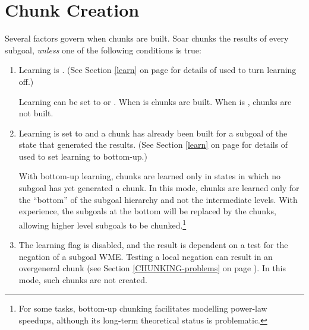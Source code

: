\section{Chunk Creation}
\label{CHUNKING-creation}

Several factors govern when chunks are built. Soar chunks the results of every
subgoal, \emph{unless} one of the following conditions is true:

\begin{enumerate}
\item Learning is . (See Section \ref{learn} on page \pageref{learn}
	for details of  used to turn learning off.) 

	Learning can be set to  or .
	When  is  chunks are built.  
	When  is , chunks are not built. 

\item Learning is set to  and a chunk has already 
	been built for a subgoal of the state that generated the results. 
	(See Section \ref{learn} on page \pageref{learn} for details of 
	 used to set learning to bottom-up.) 

	With bottom-up learning, chunks are learned only in states in which no
	subgoal has yet generated a chunk. In this mode, chunks are learned
	only for the ``bottom'' of the subgoal hierarchy and not the
	intermediate levels. With experience, the subgoals at the bottom will
	be replaced by the chunks, allowing higher level subgoals to be
	chunked.\footnote{For some tasks, bottom-up chunking facilitates
	modelling power-law speedups, although its long-term theoretical
	status is problematic.}
	

\item The learning flag  is disabled, and the
  result is dependent on a test for the negation of a subgoal WME. Testing a
  local negation can result in an overgeneral chunk (see Section
  \ref{CHUNKING-problems} on page \pageref{CHUNKING-problems}). In this mode,
  such chunks are not created.


\end{enumerate}
